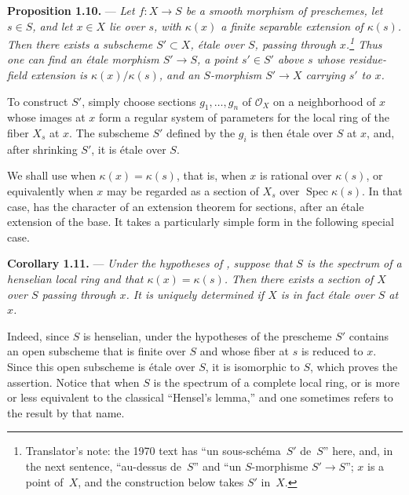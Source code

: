 \medskip
\noindent{}\textbf{Proposition 1.10.} ---
\textit{Let \(f:X\to S\) be a smooth morphism of preschemes, let
\(s\in S\), and let \(x\in X\) lie over \(s\), with \(\kappa(x)\) a
finite separable extension of \(\kappa(s)\).  Then there exists a
subscheme \(S'\subset X\), étale over \(S\), passing through
\(x\).\footnote{Translator's note: the 1970 text has ``un sous-schéma~\(S'\) de~\(S\)''
here, and, in the next sentence, ``au-dessus de~\(S\)'' and ``un \(S\)-morphisme
\(S'\to S\)''; \(x\) is a point of~\(X\), and the construction below takes \(S'\) in~\(X\).}  Thus one can find an étale morphism
\(S'\to S\), a point \(s'\in S'\) above \(s\) whose residue-field
extension is \(\kappa(x)/\kappa(s)\), and an \(S\)-morphism
\(S'\to X\) carrying \(s'\) to \(x\).}

To construct \(S'\), simply choose sections
\(g_1,\ldots,g_n\) of \(\mathscr O_X\) on a neighborhood of \(x\)
whose images at \(x\) form a regular system of parameters for the
local ring of the fiber \(X_s\) at \(x\).  The subscheme \(S'\)
defined by the \(g_i\) is then étale over \(S\) at \(x\), and, after
shrinking \(S'\), it is étale over \(S\).

We shall use
 when
\(\kappa(x)=\kappa(s)\), that is, when \(x\) is rational over
\(\kappa(s)\), or equivalently when \(x\) may be regarded as a
section of \(X_s\) over \(\operatorname{Spec}\kappa(s)\).  In that
case,  has the character
of an extension theorem for sections, after an étale extension of
the base.  It takes a particularly simple form in the following
special case.

\medskip
\noindent{}\textbf{Corollary 1.11.} ---
\textit{Under the hypotheses of
, suppose that \(S\) is
the spectrum of a henselian local ring and that
\(\kappa(x)=\kappa(s)\).  Then there exists a section of \(X\) over
\(S\) passing through \(x\).  It is uniquely determined if \(X\) is
in fact étale over \(S\) at \(x\).}

Indeed, since \(S\) is henselian, under the hypotheses of
 the prescheme \(S'\)
contains an open subscheme that is finite over \(S\) and whose fiber
at \(s\) is reduced to \(x\).  Since this open subscheme is étale
over \(S\), it is isomorphic to \(S\), which proves the assertion.
Notice that when \(S\) is the spectrum of a complete local ring,
 or
 is more or less equivalent
to the classical ``Hensel's lemma,'' and one sometimes refers to the
result by that name.

